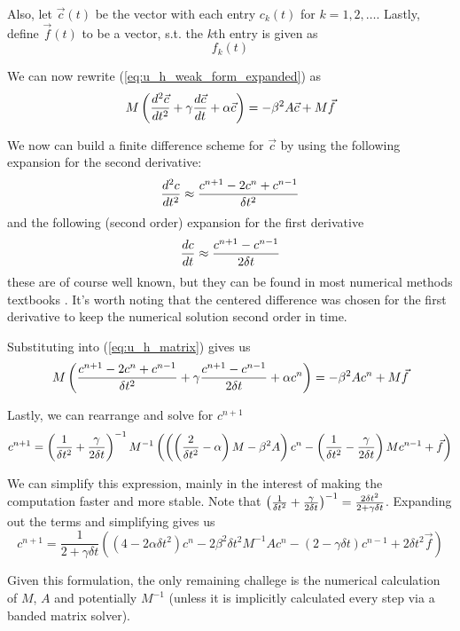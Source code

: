 Also, let $\vec{c}(t)$ be the vector with each entry $c_k(t)$ for $k=1, 2, \ldots$. Lastly, define
$\vec{f}(t)$ to be a vector, s.t. the $k$th entry is given as 
\begin{equation} \label{eq:vec_F_definition}
f_k(t)
\end{equation}

We can now rewrite (\ref{eq:u_h_weak_form_expanded}) as
\begin{equation} \label{eq:u_h_matrix}
M\left( \frac{d^2 \vec{c}}{d t^2} + \gamma\frac{d \vec{c}}{d t} + \alpha \vec{c} \right) = - \beta^2 A \vec{c} + M\vec{f}
\end{equation}

We now can build a finite difference scheme for $\vec{c}$ by using the following expansion for the second derivative:
\begin{equation} \label{eq:second_derivative_finite_difference}
\frac{d^2 c}{d t^2} \approx \frac{c^{n+1} - 2c^n + c^{n-1}}{\delta t^2}
\end{equation}
and the following (second order) expansion for the first derivative
\begin{equation} \label{eq:first_derivative_finite_difference}
\frac{d c}{d t} \approx \frac{c^{n+1} - c^{n-1}}{2\delta t}
\end{equation}
these are of course well known, but they can be found in most numerical methods textbooks \cite{difference_formulas}.
It's worth noting that the centered difference was chosen for the first derivative to keep the numerical solution second
order in time.

Substituting into (\ref{eq:u_h_matrix}) gives us
\begin{equation} \label{eq:finite_diff_weak_form}
M \left( \frac{c^{n+1} - 2c^n + c^{n-1}}{\delta t^2} + \gamma \frac{c^{n+1} - c^{n-1}}{2\delta t} + \alpha c^n \right) = - \beta^2 A c^n + M\vec{f}
\end{equation}

Lastly, we can rearrange and solve for $c^{n+1}$
\begin{equation} \label{eq:finite_diff_solution}
c^{n+1} = \left( \frac{1}{\delta t^2} + \frac{\gamma}{2\delta t} \right)^{-1} M^{-1}
\left(
\left( \left(\frac{2}{\delta t^2} - \alpha\right) M - \beta^2 A \right) c^n
-
\left( \frac{1}{\delta t^2} - \frac{\gamma}{2\delta t} \right) M c^{n-1}
+
\vec{f}
\right)
\end{equation}

We can simplify this expression, mainly in the interest of making the computation faster and more stable. Note
that $\left( \frac{1}{\delta t^2} + \frac{\gamma}{2\delta t} \right)^{-1} = \frac{2\delta t^2}{2 + \gamma\delta t}$. Expanding out the terms and simplifying gives us
\begin{equation}
c^{n+1}
=
\frac{1}{2 + \gamma\delta t} \left(
(4 - 2\alpha\delta t^2)c^n  - 2\beta^2\delta t^2M^{-1}Ac^n
- (2 - \gamma\delta t)c^{n-1}
+ 2\delta t^2 \vec{f}
\right)
\end{equation}

Given this formulation, the only remaining challege is the numerical calculation of $M$, $A$ and potentially
$M^{-1}$ (unless it is implicitly calculated every step via a banded matrix solver).

